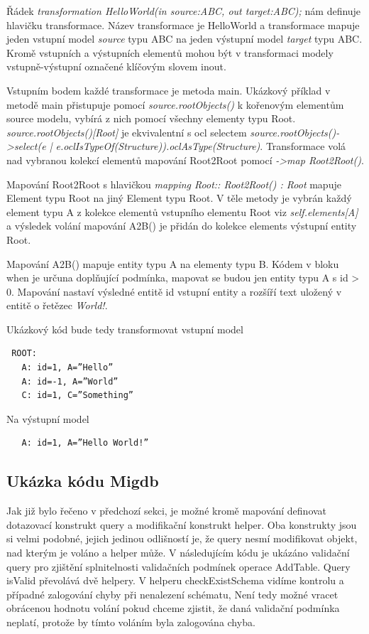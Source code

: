 \documentclass[11pt,twoside,a4paper]{book}
\begin{document}
Řádek \textit{transformation HelloWorld(in source:ABC, out target:ABC);} nám
definuje hlavičku transformace. Název transformace je HelloWorld a transformace
mapuje jeden vstupní model \textit{source} typu ABC na jeden výstupní model
\textit{target} typu ABC. Kromě vstupních a výstupních elementů mohou být v
transformaci modely vstupně-výstupní označené klíčovým slovem inout.

Vstupním bodem každé transformace je metoda main. Ukázkový příklad v metodě main
přistupuje pomocí \textit{source.rootObjects()} k kořenovým elementům source
modelu, vybírá z nich pomocí \uv{[Root]} všechny elementy typu Root.
\textit{source.rootObjects()[Root]} je ekvivalentní s ocl selectem
\textit{source.rootObjects()->select(e |
e.oclIsTypeOf(Structure)).oclAsType(Structure)}.
Transformace volá nad vybranou kolekcí elementů mapování Root2Root pomocí
\textit{->map Root2Root()}. 

Mapování Root2Root s hlavičkou \textit{mapping Root:: Root2Root() : Root}
mapuje Element typu Root na jiný Element typu Root. V těle metody je vybrán
každý element typu A z kolekce elementů vstupního elementu Root viz
\textit{self.elements[A]} a výsledek volání mapování A2B() je přidán do
kolekce elements výstupní entity Root.

Mapování A2B() mapuje entity typu A na elementy typu B. Kódem v bloku when
je určuna doplňující podmínka, mapovat se budou jen entity typu A s id > 0.
Mapování nastaví výsledné entitě id vstupní entity a rozšíří text uložený v
entitě o řetězec \textit{World!}. 

Ukázkový kód bude tedy transformovat vstupní model 
\begin{verbatim}
 ROOT:
   A: id=1, A=”Hello”
   A: id=-1, A=”World”
   C: id=1, C=”Something”
\end{verbatim}

Na výstupní model
\begin{verbatim}
   A: id=1, A=”Hello World!”
\end{verbatim}

\subsection{Ukázka kódu Migdb}
Jak již bylo řečeno v předchozí sekci, je možné kromě mapování definovat
dotazovací konstrukt query a modifikační konstrukt helper. Oba konstrukty jsou
si velmi podobné, jejich jedinou odlišností je, že query nesmí modifikovat
objekt, nad kterým je voláno a helper může. V následujícím kódu je ukázáno
validační query pro zjištění splnitelnosti validačních podmínek operace
AddTable. Query isValid převolává dvě helpery. V helperu checkExistSchema
vidíme kontrolu a případné zalogování chyby při nenalezení schématu, Není tedy
možné vracet obrácenou hodnotu volání pokud chceme zjistit, že daná validační
podmínka neplatí, protože by tímto voláním byla zalogována chyba.
\end{document}
